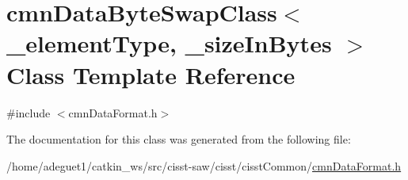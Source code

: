 \hypertarget{classcmn_data_byte_swap_class}{\section{cmn\-Data\-Byte\-Swap\-Class$<$ \-\_\-element\-Type, \-\_\-size\-In\-Bytes $>$ Class Template Reference}
\label{classcmn_data_byte_swap_class}
}


{\ttfamily \#include $<$cmn\-Data\-Format.\-h$>$}



The documentation for this class was generated from the following file\-:\begin{DoxyCompactItemize}
\item 
/home/adeguet1/catkin\-\_\-ws/src/cisst-\/saw/cisst/cisst\-Common/\hyperlink{cmn_data_format_8h}{cmn\-Data\-Format.\-h}\end{DoxyCompactItemize}
